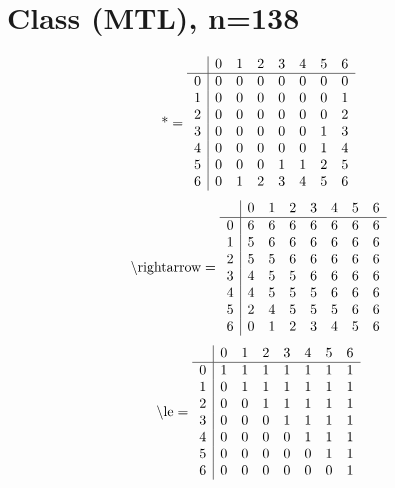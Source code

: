 \documentclass[11pt]{article}
\begin{document}
\section{Class (MTL), n=138}
\[\text{*} = 
\begin{array}{r | r r r r r r r}
 & 0 & 1 & 2 & 3 & 4 & 5 & 6 \\ \hline
0 & 0 & 0 & 0 & 0 & 0 & 0 & 0 \\
1 & 0 & 0 & 0 & 0 & 0 & 0 & 1 \\
2 & 0 & 0 & 0 & 0 & 0 & 0 & 2 \\
3 & 0 & 0 & 0 & 0 & 0 & 1 & 3 \\
4 & 0 & 0 & 0 & 0 & 0 & 1 & 4 \\
5 & 0 & 0 & 0 & 1 & 1 & 2 & 5 \\
6 & 0 & 1 & 2 & 3 & 4 & 5 & 6 \\
\end{array}
\]
\[\text{\textbackslash rightarrow} = 
\begin{array}{r | r r r r r r r}
 & 0 & 1 & 2 & 3 & 4 & 5 & 6 \\ \hline
0 & 6 & 6 & 6 & 6 & 6 & 6 & 6 \\
1 & 5 & 6 & 6 & 6 & 6 & 6 & 6 \\
2 & 5 & 5 & 6 & 6 & 6 & 6 & 6 \\
3 & 4 & 5 & 5 & 6 & 6 & 6 & 6 \\
4 & 4 & 5 & 5 & 5 & 6 & 6 & 6 \\
5 & 2 & 4 & 5 & 5 & 5 & 6 & 6 \\
6 & 0 & 1 & 2 & 3 & 4 & 5 & 6 \\
\end{array}
\]
\[\text{\textbackslash le} = 
\begin{array}{r | r r r r r r r}
 & 0 & 1 & 2 & 3 & 4 & 5 & 6 \\ \hline
0 & 1 & 1 & 1 & 1 & 1 & 1 & 1 \\
1 & 0 & 1 & 1 & 1 & 1 & 1 & 1 \\
2 & 0 & 0 & 1 & 1 & 1 & 1 & 1 \\
3 & 0 & 0 & 0 & 1 & 1 & 1 & 1 \\
4 & 0 & 0 & 0 & 0 & 1 & 1 & 1 \\
5 & 0 & 0 & 0 & 0 & 0 & 1 & 1 \\
6 & 0 & 0 & 0 & 0 & 0 & 0 & 1 \\
\end{array}
\]
\end{document}
